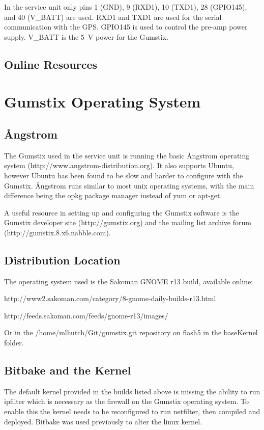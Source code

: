In the service unit only pins 1 (GND), 9 (RXD1), 10 (TXD1), 28 (GPIO145), and 40 (V\_BATT) are used.
RXD1 and TXD1 are used for the serial communication with the GPS.
GPIO145 is used to control the pre-amp power supply.
V\_BATT is the 5~V power for the Gumstix.

\subsection{Online Resources}

\section{Gumstix Operating System}

\subsection{\r{A}ngstrom}

The Gumstix used in the service unit is running the basic \r{A}ngstrom operating system (http://www.angstrom-distribution.org).
It also supports Ubuntu, however Ubuntu has been found to be slow and harder to configure with the Gumstix.
\r{A}ngstrom runs similar to most unix operating systems, with the main difference being the opkg package manager instead of yum or apt-get.

A useful resource in setting up and configuring the Gumstix software is the Gumstix developer site (http://gumstix.org) and the mailing list archive forum (http://gumstix.8.x6.nabble.com).

\subsection{Distribution Location}
\label{app:gum:distribution}
The operating system used is the Sakoman GNOME r13 build, available online:

http://www2.sakoman.com/category/8-gnome-daily-builds-r13.html

http://feeds.sakoman.com/feeds/gnome-r13/images/

Or in the /home/mlhutch/Git/gumstix.git repository on flash5 in the baseKernel folder.

\subsection{Bitbake and the Kernel}

The default kernel provided in the builds listed above is missing the ability to run ipfilter which is necessary as the firewall on the Gumstix operating system.
To enable this the kernel needs to be reconfigured to run netfilter, then compiled and deployed.
Bitbake was used previously to alter the linux kernel.

